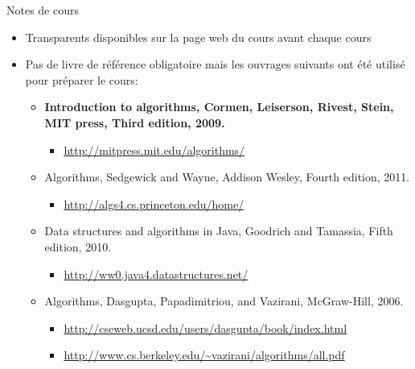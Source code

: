 \begin{frame}{Notes de cours}
\begin{itemize}
\item Transparents disponibles sur la page web du cours avant chaque cours
\item Pas de livre de référence obligatoire mais les ouvrages suivants ont été utilisé pour préparer le cours:
{\small
\begin{itemize}
\item {\bf Introduction to algorithms, Cormen, Leiserson, Rivest, Stein, MIT press, Third edition, 2009.}
\begin{itemize}
\item \url{http://mitpress.mit.edu/algorithms/}
\end{itemize}
\item Algorithms, Sedgewick and Wayne, Addison Wesley, Fourth edition, 2011.
\begin{itemize}
\item \url{http://algs4.cs.princeton.edu/home/}
\end{itemize}
\item Data structures and algorithms in Java, Goodrich and Tamassia, Fifth edition, 2010.
\begin{itemize}
\item \url{http://ww0.java4.datastructures.net/}
\end{itemize}
\item Algorithms, Dasgupta, Papadimitriou, and Vazirani, McGraw-Hill, 2006.
\begin{itemize}
\item \url{http://cseweb.ucsd.edu/users/dasgupta/book/index.html}
\item \url{http://www.cs.berkeley.edu/~vazirani/algorithms/all.pdf}
\end{itemize}
\end{itemize}
}
\end{itemize}
\end{frame}

